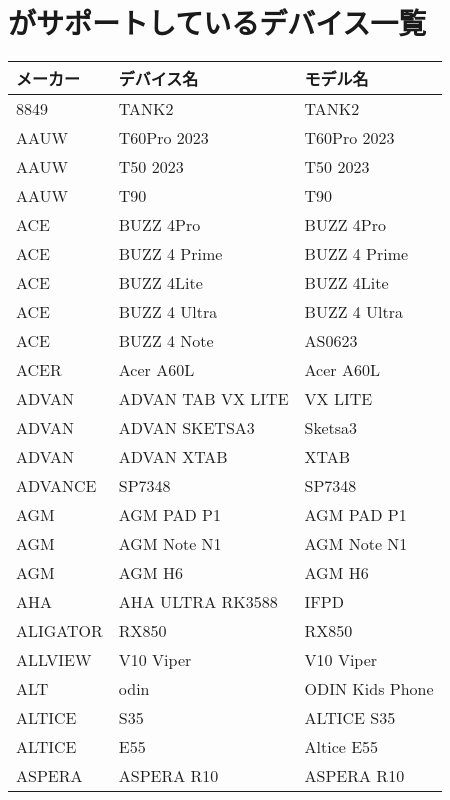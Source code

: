 \appendix
\section{\currentVersion がサポートしているデバイス一覧}
\label{sec:supporteddevices}
\setlongtables
\begin{tabularx}{\linewidth}{|l|X|X|}
    \hline
        \cellcolor{gray}メーカー & \cellcolor{gray}デバイス名 & \cellcolor{gray}モデル名 \\ \hline
        \endhead

        8849 & TANK2 & TANK2 \\ \hline
        AAUW & T60Pro 2023 & T60Pro 2023 \\ \hline
        AAUW & T50 2023 & T50 2023 \\ \hline
        AAUW & T90 & T90 \\ \hline
        ACE & BUZZ 4Pro & BUZZ 4Pro \\ \hline
        ACE & BUZZ 4 Prime & BUZZ 4 Prime \\ \hline
        ACE & BUZZ 4Lite & BUZZ 4Lite \\ \hline
        ACE & BUZZ 4 Ultra & BUZZ 4 Ultra \\ \hline
        ACE & BUZZ 4 Note & AS0623 \\ \hline
        ACER & Acer A60L & Acer A60L \\ \hline
        ADVAN & ADVAN TAB VX LITE & VX LITE \\ \hline
        ADVAN & ADVAN SKETSA3 & Sketsa3 \\ \hline
        ADVAN & ADVAN XTAB & XTAB \\ \hline
        ADVANCE & SP7348 & SP7348 \\ \hline
        AGM & AGM PAD P1 & AGM PAD P1 \\ \hline
        AGM & AGM Note N1 & AGM Note N1 \\ \hline
        AGM & AGM H6 & AGM H6 \\ \hline
        AHA & AHA ULTRA RK3588 & IFPD \\ \hline
        ALIGATOR & RX850 & RX850 \\ \hline
        ALLVIEW & V10 Viper & V10 Viper \\ \hline
        ALT & odin & ODIN Kids Phone \\ \hline
        ALTICE & S35 & ALTICE S35 \\ \hline
        ALTICE & E55 & Altice E55 \\ \hline
        ASPERA & ASPERA R10 & ASPERA R10 \\ \hline

\end{tabularx}

